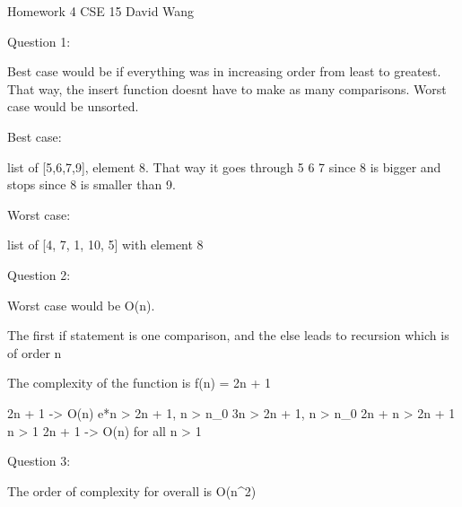 Homework 4
CSE 15
David Wang

Question 1:

Best case would be if everything was in increasing order from least to greatest. That way, the insert function doesnt have to make as many comparisons. Worst case would be unsorted.

Best case:


 list of [5,6,7,9], element 8. That way it goes through 5 6 7 since 8 is bigger and stops since 8 is smaller than 9.

Worst case:

list of [4, 7, 1, 10, 5] with element 8


Question 2:

Worst case would be O(n).

The first if statement is one comparison, and the else leads to recursion which is of order n

The complexity of the function is f(n) = 2n + 1

2n + 1 -> O(n)
e*n > 2n + 1, n > n_0
3n > 2n + 1, n > n_0
2n + n > 2n + 1
n > 1
2n + 1 -> O(n) for all n > 1

Question 3:

The order of complexity for overall is O(n^2)

